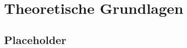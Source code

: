 \chapter{Theoretische Grundlagen} \label{3.theoretischeGrundlagen}

	\section{Placeholder}
		\lipsum